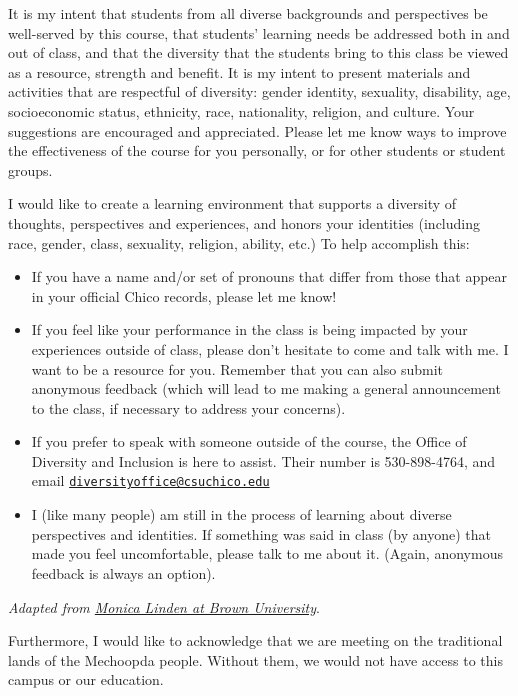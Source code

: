 \documentclass[
  11pt,
]{article}
\providecommand{\tightlist}{%
  \setlength{\itemsep}{0pt}\setlength{\parskip}{0pt}}
\begin{document}
It is my intent that students from all diverse backgrounds and
perspectives be well-served by this course, that students' learning
needs be addressed both in and out of class, and that the diversity that
the students bring to this class be viewed as a resource, strength and
benefit. It is my intent to present materials and activities that are
respectful of diversity: gender identity, sexuality, disability, age,
socioeconomic status, ethnicity, race, nationality, religion, and
culture. Your suggestions are encouraged and appreciated. Please let me
know ways to improve the effectiveness of the course for you personally,
or for other students or student groups.

I would like to create a learning environment that supports a diversity
of thoughts, perspectives and experiences, and honors your identities
(including race, gender, class, sexuality, religion, ability, etc.) To
help accomplish this:

\begin{itemize}
\tightlist
\item
  If you have a name and/or set of pronouns that differ from those that
  appear in your official Chico records, please let me know!
\item
  If you feel like your performance in the class is being impacted by
  your experiences outside of class, please don't hesitate to come and
  talk with me. I want to be a resource for you. Remember that you can
  also submit anonymous feedback (which will lead to me making a general
  announcement to the class, if necessary to address your concerns).
\item
  If you prefer to speak with someone outside of the course, the Office
  of Diversity and Inclusion is here to assist. Their number is
  530-898-4764, and email
  \href{mailto:diversityoffice@csuchico.edu}{\nolinkurl{diversityoffice@csuchico.edu}}
\item
  I (like many people) am still in the process of learning about diverse
  perspectives and identities. If something was said in class (by
  anyone) that made you feel uncomfortable, please talk to me about it.
  (Again, anonymous feedback is always an option).
\end{itemize}

\emph{Adapted from
\href{https://www.brown.edu/sheridan/teaching-learning-resources/inclusive-teaching/statements}{Monica
Linden at Brown University}}.

Furthermore, I would like to acknowledge that we are meeting on the
traditional lands of the Mechoopda people. Without them, we would not
have access to this campus or our education.
\end{document}
